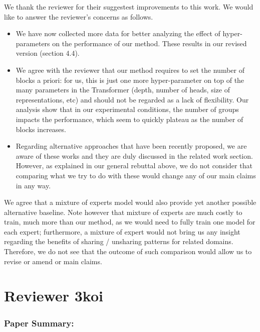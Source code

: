 \documentclass[12pt,times,a4paper,twoside]{article}
\theoremstyle{definition}
\begin{document}
{\color{blue}
We thank the reviewer for their suggestest improvements to this work. We would like to answer the reviewer's concerns as follows.

\begin{itemize}
\item %
  We have now collected more data for better analyzing the effect of hyper-parameters on the performance of our method. These results in our revised version (section 4.4).
  
\item We agree with the reviewer that our method requires to set the number of blocks a priori: for us, this is just one more hyper-parameter on top of the many parameters in the Transformer (depth, number of heads, size of representations, etc) and should not be regarded as a lack of flexibility. Our analysis show that in our experimental conditions, the number of groups impacts the performance, which seem to quickly plateau as the number of blocks increases.
  
\item Regarding alternative approaches that have been recently proposed, we are aware of these works and they are duly discussed in the related work section. However, as explained in our general rebuttal above, we do not consider that comparing what we try to do with these would change any of our main claims in any way.\done{}
\end{itemize}

We agree that a mixture of experts model would also provide yet another possible alternative baseline. Note however that mixture of experts are much costly to train, much more than our method, as we would need to fully train one model for each expert; furthermore, a mixture of expert would not bring us any insight regarding the benefits of sharing / unsharing patterns for related domains. Therefore, we do not see that the outcome of such comparison would allow us to revise or amend or main claims.
}
\section*{Reviewer 3koi}

\subsubsection*{Paper Summary:}
\end{document}
